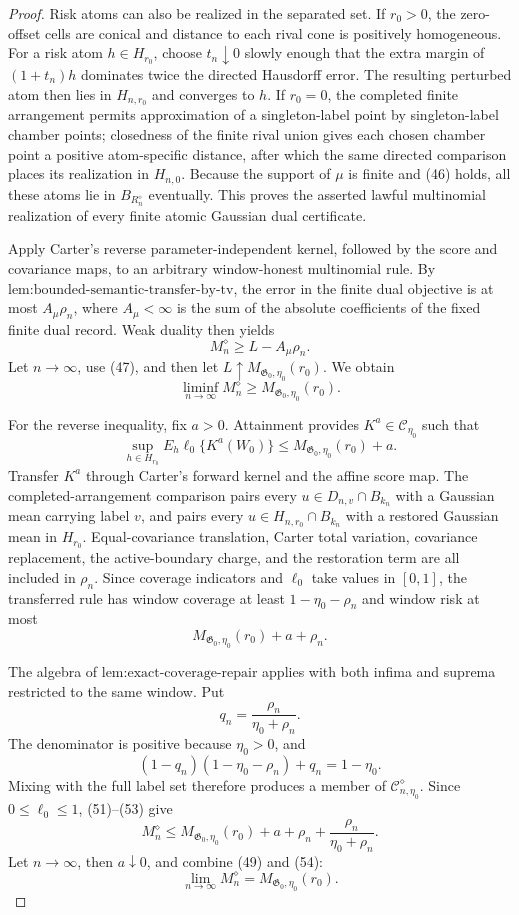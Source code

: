 \documentclass{article}
\begin{document}
\begin{proof}
Risk atoms can also be realized in the separated set.  If \(r_0>0\), the zero-offset cells are conical and distance to each rival cone is positively homogeneous.  For a risk atom \(h\in H_{r_0}\), choose \(t_n\downarrow0\) slowly enough that the extra margin of \((1+t_n)h\) dominates twice the directed Hausdorff error.  The resulting perturbed atom then lies in \(H_{n,r_0}\) and converges to \(h\).  If \(r_0=0\), the completed finite arrangement permits approximation of a singleton-label point by singleton-label chamber points; closedness of the finite rival union gives each chosen chamber point a positive atom-specific distance, after which the same directed comparison places its realization in \(H_{n,0}\).  Because the support of \(\mu\) is finite and (46) holds, all these atoms lie in \(B_{R_n^{\diamond}}\) eventually.  This proves the asserted lawful multinomial realization of every finite atomic Gaussian dual certificate.

Apply Carter's reverse parameter-independent kernel, followed by the score and covariance maps, to an arbitrary window-honest multinomial rule.  By \(\text{lem:bounded-semantic-transfer-by-tv}\), the error in the finite dual objective is at most \(A_\mu\rho_n\), where \(A_\mu<\infty\) is the sum of the absolute coefficients of the fixed finite dual record.  Weak duality then yields
\[
 M_n^{\diamond}\ge L-A_\mu\rho_n.
 \tag{48}
\]
Let \(n\to\infty\), use (47), and then let \(L\uparrow M_{\mathfrak G_0,\eta_0}(r_0)\).  We obtain
\[
 \liminf_{n\to\infty}M_n^{\diamond}
 \ge M_{\mathfrak G_0,\eta_0}(r_0).
 \tag{49}
\]

For the reverse inequality, fix \(a>0\).  Attainment provides \(K^a\in\mathcal C_{\eta_0}\) such that
\[
 \sup_{h\in H_{r_0}}E_h\ell_0\{K^a(W_0)\}
 \le M_{\mathfrak G_0,\eta_0}(r_0)+a.
 \tag{50}
\]
Transfer \(K^a\) through Carter's forward kernel and the affine score map.  The completed-arrangement comparison pairs every \(u\in D_{n,v}\cap B_{k_n}\) with a Gaussian mean carrying label \(v\), and pairs every \(u\in H_{n,r_0}\cap B_{k_n}\) with a restored Gaussian mean in \(H_{r_0}\).  Equal-covariance translation, Carter total variation, covariance replacement, the active-boundary charge, and the restoration term are all included in \(\rho_n\).  Since coverage indicators and \(\ell_0\) take values in \([0,1]\), the transferred rule has window coverage at least \(1-\eta_0-\rho_n\) and window risk at most
\[
 M_{\mathfrak G_0,\eta_0}(r_0)+a+\rho_n.
 \tag{51}
\]

The algebra of \(\text{lem:exact-coverage-repair}\) applies with both infima and suprema restricted to the same window.  Put
\[
 q_n=\frac{\rho_n}{\eta_0+\rho_n}.
 \tag{52}
\]
The denominator is positive because \(\eta_0>0\), and
\[
 (1-q_n)(1-\eta_0-\rho_n)+q_n=1-\eta_0.
 \tag{53}
\]
Mixing with the full label set therefore produces a member of \(\mathcal C_{n,\eta_0}^{\diamond}\).  Since \(0\le\ell_0\le1\), (51)--(53) give
\[
 M_n^{\diamond}
 \le M_{\mathfrak G_0,\eta_0}(r_0)+a+\rho_n
 +\frac{\rho_n}{\eta_0+\rho_n}.
 \tag{54}
\]
Let \(n\to\infty\), then \(a\downarrow0\), and combine (49) and (54):
\[
 \lim_{n\to\infty}M_n^{\diamond}
 =M_{\mathfrak G_0,\eta_0}(r_0).
 \tag{55}
\]


\end{proof}
\end{document}
